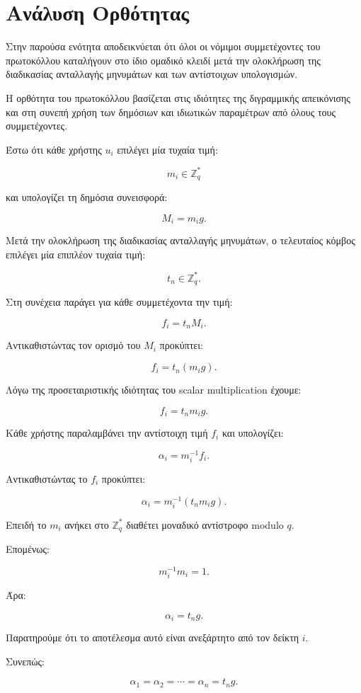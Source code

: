 \documentclass[12pt,a4paper]{report}
\begin{document}
\section{Ανάλυση Ορθότητας}

Στην παρούσα ενότητα αποδεικνύεται ότι όλοι οι νόμιμοι συμμετέχοντες του πρωτοκόλλου καταλήγουν στο ίδιο ομαδικό κλειδί μετά την ολοκλήρωση της διαδικασίας ανταλλαγής μηνυμάτων και των αντίστοιχων υπολογισμών.

Η ορθότητα του πρωτοκόλλου βασίζεται στις ιδιότητες της διγραμμικής απεικόνισης και στη συνεπή χρήση των δημόσιων και ιδιωτικών παραμέτρων από όλους τους συμμετέχοντες.

Έστω ότι κάθε χρήστης $u_i$ επιλέγει μία τυχαία τιμή:

\[
m_i \in \mathbb{Z}_q^{*}
\]

και υπολογίζει τη δημόσια συνεισφορά:

\[
M_i=m_i g.
\]

Μετά την ολοκλήρωση της διαδικασίας ανταλλαγής μηνυμάτων, ο τελευταίος κόμβος επιλέγει μία επιπλέον τυχαία τιμή:

\[
t_n \in \mathbb{Z}_q^{*}.
\]

Στη συνέχεια παράγει για κάθε συμμετέχοντα την τιμή:

\[
f_i=t_nM_i.
\]

Αντικαθιστώντας τον ορισμό του $M_i$ προκύπτει:

\[
f_i=t_n(m_ig).
\]

Λόγω της προσεταιριστικής ιδιότητας του scalar multiplication έχουμε:

\[
f_i=t_nm_ig.
\]

Κάθε χρήστης παραλαμβάνει την αντίστοιχη τιμή $f_i$ και υπολογίζει:

\[
\alpha_i=m_i^{-1}f_i.
\]

Αντικαθιστώντας το $f_i$ προκύπτει:

\[
\alpha_i
=
m_i^{-1}(t_nm_ig).
\]

Επειδή το $m_i$ ανήκει στο $\mathbb{Z}_q^{*}$ διαθέτει μοναδικό αντίστροφο modulo $q$.

Επομένως:

\[
m_i^{-1}m_i=1.
\]

Άρα:

\[
\alpha_i=t_ng.
\]

Παρατηρούμε ότι το αποτέλεσμα αυτό είναι ανεξάρτητο από τον δείκτη $i$.

Συνεπώς:

\[
\alpha_1=\alpha_2=\cdots=\alpha_n=t_ng.
\]
\end{document}

